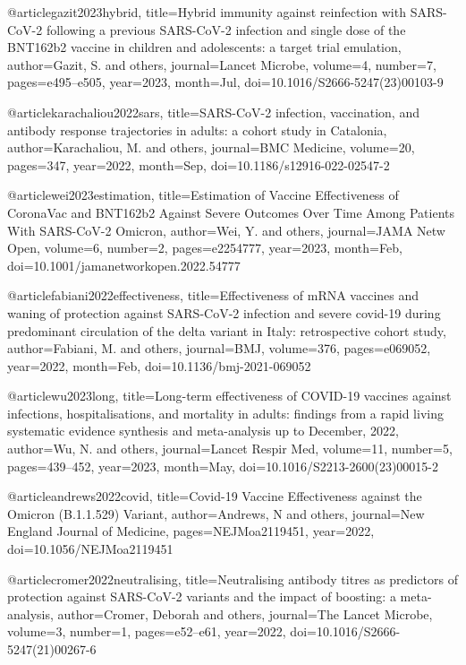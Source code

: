 @article{gazit2023hybrid,
	title={Hybrid immunity against reinfection with SARS-CoV-2 following a previous SARS-CoV-2 infection and single dose of the BNT162b2 vaccine in children and adolescents: a target trial emulation},
	author={Gazit, S. and others},
	journal={Lancet Microbe},
	volume={4},
	number={7},
	pages={e495--e505},
	year={2023},
	month={Jul},
	doi={10.1016/S2666-5247(23)00103-9}
}

@article{karachaliou2022sars,
	title={SARS-CoV-2 infection, vaccination, and antibody response trajectories in adults: a cohort study in Catalonia},
	author={Karachaliou, M. and others},
	journal={BMC Medicine},
	volume={20},
	pages={347},
	year={2022},
	month={Sep},
	doi={10.1186/s12916-022-02547-2}
}

@article{wei2023estimation,
	title={Estimation of Vaccine Effectiveness of CoronaVac and BNT162b2 Against Severe Outcomes Over Time Among Patients With SARS-CoV-2 Omicron},
	author={Wei, Y. and others},
	journal={JAMA Netw Open},
	volume={6},
	number={2},
	pages={e2254777},
	year={2023},
	month={Feb},
	doi={10.1001/jamanetworkopen.2022.54777}
}

@article{fabiani2022effectiveness,
	title={Effectiveness of mRNA vaccines and waning of protection against SARS-CoV-2 infection and severe covid-19 during predominant circulation of the delta variant in Italy: retrospective cohort study},
	author={Fabiani, M. and others},
	journal={BMJ},
	volume={376},
	pages={e069052},
	year={2022},
	month={Feb},
	doi={10.1136/bmj-2021-069052}
}

@article{wu2023long,
	title={Long-term effectiveness of COVID-19 vaccines against infections, hospitalisations, and mortality in adults: findings from a rapid living systematic evidence synthesis and meta-analysis up to December, 2022},
	author={Wu, N. and others},
	journal={Lancet Respir Med},
	volume={11},
	number={5},
	pages={439--452},
	year={2023},
	month={May},
	doi={10.1016/S2213-2600(23)00015-2}
}

@article{andrews2022covid,
	title={Covid-19 Vaccine Effectiveness against the Omicron (B.1.1.529) Variant},
	author={Andrews, N and others},
	journal={New England Journal of Medicine},
	pages={NEJMoa2119451},
	year={2022},
	doi={10.1056/NEJMoa2119451}
}

@article{cromer2022neutralising,
	title={Neutralising antibody titres as predictors of protection against SARS-CoV-2 variants and the impact of boosting: a meta-analysis},
	author={Cromer, Deborah and others},
	journal={The Lancet Microbe},
	volume={3},
	number={1},
	pages={e52--e61},
	year={2022},
	doi={10.1016/S2666-5247(21)00267-6}
}

